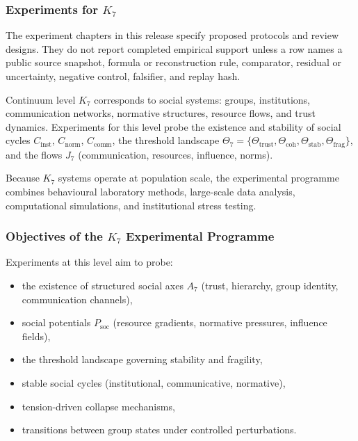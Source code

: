 
\subsubsection{Experiments for \texorpdfstring{$K_7$}{K_7}}

The experiment chapters in this release specify proposed protocols and review designs. They do not report completed empirical support unless a row names a public source snapshot, formula or reconstruction rule, comparator, residual or uncertainty, negative control, falsifier, and replay hash.
\label{sec:experiments-k7}

Continuum level $K_7$ corresponds to social systems:
groups, institutions, communication networks, normative structures,
resource flows, and trust dynamics.
Experiments for this level probe the existence and stability of
social cycles $C_{\mathrm{inst}}$, $C_{\mathrm{norm}}$,
$C_{\mathrm{comm}}$, the threshold landscape
$\Theta_7 = \{\Theta_{\mathrm{trust}}, \Theta_{\mathrm{coh}},
\Theta_{\mathrm{stab}}, \Theta_{\mathrm{frag}}\}$,
and the flows $J_7$ (communication, resources, influence, norms).

Because $K_7$ systems operate at population scale, the
experimental programme combines behavioural laboratory methods,
large-scale data analysis, computational simulations, and
institutional stress testing.



\subsubsection{Objectives of the \texorpdfstring{$K_7$}{K_7} Experimental Programme}

Experiments at this level aim to probe:

\begin{itemize}
    \item the existence of structured social axes $A_7$
          (trust, hierarchy, group identity, communication channels),
    \item social potentials $P_{\mathrm{soc}}$ (resource gradients,
          normative pressures, influence fields),
    \item the threshold landscape governing stability and fragility,
    \item stable social cycles (institutional, communicative, normative),
    \item tension-driven collapse mechanisms,
    \item transitions between group states under controlled perturbations.
\end{itemize}



